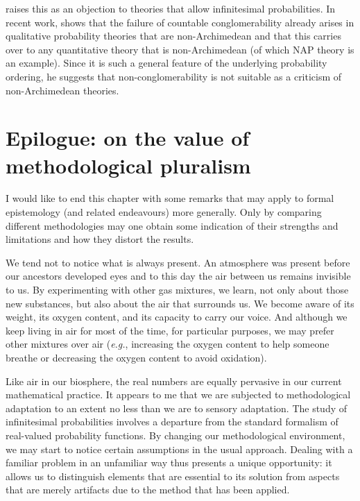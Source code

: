 \citet{Pruss:2012,Pruss:2014} raises this as an objection to theories that allow infinitesimal probabilities. In recent work, \citet[p.~1200]{DiBella:2018} shows that the failure of countable conglomerability already arises in qualitative probability theories that are non-Archimedean and that this carries over to any quantitative theory that is non-Archimedean (of which NAP theory is an example). Since it is such a general feature of the underlying probability ordering, he suggests that non-conglomerability is not suitable as a criticism of non-Archimedean theories.

\section[Epilogue]{Epilogue: on the value of methodological pluralism}
I would like to end this chapter with some remarks that may apply to formal epistemology (and related endeavours) more generally. Only by comparing different methodologies may one obtain some indication of their strengths and limitations and how they distort the results.

We tend not to notice what is always present. An atmosphere was present before our ancestors developed eyes and to this day the air between us remains invisible to us. By experimenting with other gas mixtures, we learn, not only about those new substances, but also about the air that surrounds us. We become aware of its weight, its oxygen content, and its capacity to carry our voice.
And although we keep living in air for most of the time, for particular purposes, we may prefer other mixtures over air (\textit{e.g.}, increasing the oxygen content to help someone breathe or decreasing the oxygen content to avoid oxidation).

Like air in our biosphere, the real numbers are equally pervasive in our current mathematical practice. It appears to me that we are subjected to methodological adaptation to an extent no less than we are to sensory adaptation. The study of infinitesimal probabilities involves a departure from the standard formalism of real-valued probability functions. By changing our methodological environment, we may start to notice certain assumptions in the usual approach. Dealing with a familiar problem in an unfamiliar way thus presents a unique opportunity: it allows us to distinguish elements that are essential to its solution from aspects that are merely artifacts due to the method that has been applied.

